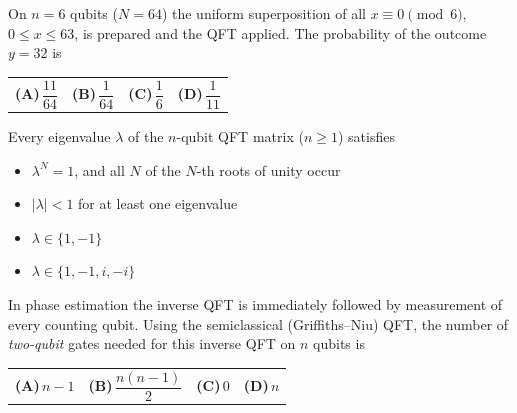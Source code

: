 \documentclass[11pt,a4paper]{article}
\newcommand{\optlabel}[1]{\textbf{(#1)}}
\newenvironment{qitem}[1]{\begin{list}{}{\setlength{\leftmargin}{3.3em}\setlength{\labelwidth}{3.1em}%
  \setlength{\labelsep}{0.2em}\setlength{\topsep}{3pt}\setlength{\parsep}{3pt}}\item[\textbf{Q.#1}\hfill]}{\end{list}}
\newcommand{\qsep}{\par\vspace{2pt}{\color{black!15}\hrule}\vspace{4pt}}
\begin{document}
\begin{qitem}{72}
On $n = 6$ qubits ($N = 64$) the uniform superposition of all $x \equiv 0 \pmod 6$, $0 \le x \le 63$, is prepared and the
QFT applied. The probability of the outcome $y = 32$ is
\par\smallskip\noindent\begin{tabularx}{\linewidth}{@{}*{4}{L}@{}}
\optlabel{A}\,$\dfrac{11}{64}$ & \optlabel{B}\,$\dfrac{1}{64}$ & \optlabel{C}\,$\dfrac16$ & \optlabel{D}\,$\dfrac{1}{11}$
\end{tabularx}
\end{qitem}
\qsep

\begin{qitem}{73}
Every eigenvalue $\lambda$ of the $n$-qubit QFT matrix ($n \ge 1$) satisfies
\begin{itemize}[leftmargin=2.6em, labelsep=0.4em, itemsep=2pt, topsep=3pt]
\item[\optlabel{A}] $\lambda^{N} = 1$, and all $N$ of the $N$-th roots of unity occur
\item[\optlabel{B}] $|\lambda| < 1$ for at least one eigenvalue
\item[\optlabel{C}] $\lambda \in \{1, -1\}$
\item[\optlabel{D}] $\lambda \in \{1, -1, i, -i\}$
\end{itemize}
\end{qitem}
\qsep

\begin{qitem}{74}
In phase estimation the inverse QFT is immediately followed by measurement of every counting qubit. Using the
semiclassical (Griffiths--Niu) QFT, the number of \emph{two-qubit} gates needed for this inverse QFT on $n$ qubits is
\par\smallskip\noindent\begin{tabularx}{\linewidth}{@{}*{4}{L}@{}}
\optlabel{A}\,$n - 1$ & \optlabel{B}\,$\dfrac{n(n-1)}{2}$ & \optlabel{C}\,$0$ & \optlabel{D}\,$n$
\end{tabularx}
\end{qitem}
\qsep
\end{document}
